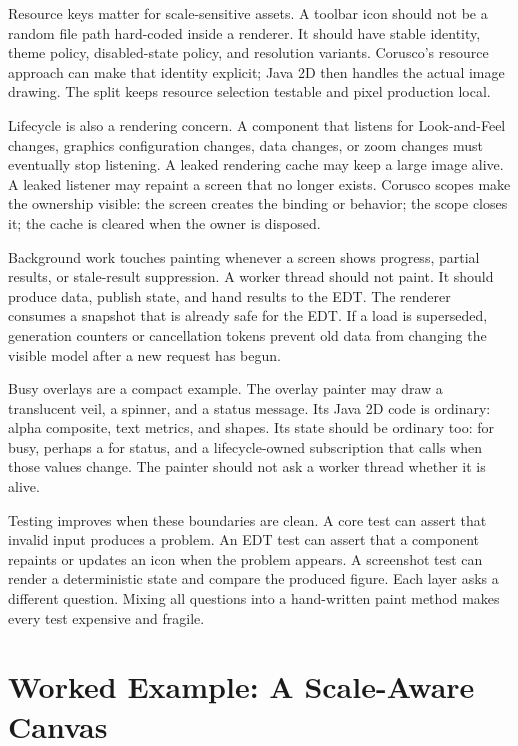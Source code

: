 Resource keys matter for scale-sensitive assets. A toolbar icon should not be a random file path hard-coded inside a renderer. It should have stable identity, theme policy, disabled-state policy, and resolution variants. Corusco's resource approach can make that identity explicit; Java 2D then handles the actual image drawing. The split keeps resource selection testable and pixel production local.

Lifecycle is also a rendering concern. A component that listens for Look-and-Feel changes, graphics configuration changes, data changes, or zoom changes must eventually stop listening. A leaked rendering cache may keep a large image alive. A leaked listener may repaint a screen that no longer exists. Corusco scopes make the ownership visible: the screen creates the binding or behavior; the scope closes it; the cache is cleared when the owner is disposed.

Background work touches painting whenever a screen shows progress, partial results, or stale-result suppression. A worker thread should not paint. It should produce data, publish state, and hand results to the EDT. The renderer consumes a snapshot that is already safe for the EDT. If a load is superseded, generation counters or cancellation tokens prevent old data from changing the visible model after a new request has begun.

Busy overlays are a compact example. The overlay painter may draw a translucent veil, a spinner, and a status message. Its Java 2D code is ordinary: alpha composite, text metrics, and shapes. Its state should be ordinary too:  for busy, perhaps a  for status, and a lifecycle-owned subscription that calls  when those values change. The painter should not ask a worker thread whether it is alive.

Testing improves when these boundaries are clean. A core test can assert that invalid input produces a problem. An EDT test can assert that a component repaints or updates an icon when the problem appears. A screenshot test can render a deterministic state and compare the produced figure. Each layer asks a different question. Mixing all questions into a hand-written paint method makes every test expensive and fragile.

\section{Worked Example: A Scale-Aware Canvas}

